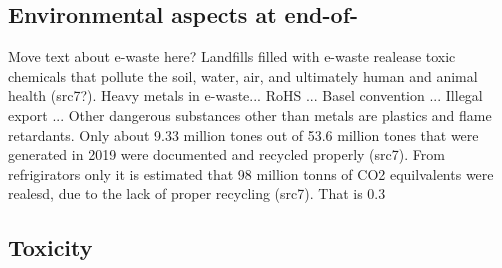 \subsection{Environmental aspects at end-of-}

Move text about e-waste here?
Landfills filled with e-waste realease toxic chemicals that pollute the soil, water, air, and ultimately human and animal health (src7?).
Heavy metals in e-waste...
RoHS ...
Basel convention ...
Illegal export ...
Other dangerous substances other than metals are plastics and flame retardants. 
Only about 9.33 million tones out of 53.6 million tones that were generated in 2019 were documented and recycled properly (src7). From refrigirators only it is estimated that 98 million tonns of CO2 equilvalents were realesd, due to the lack of proper recycling (src7). That is 0.3%

\subsection{Toxicity}